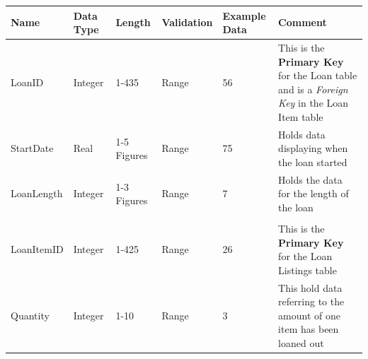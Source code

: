 \begin{landscape}
    \begin{center}
        \begin{tabular}{|p{3cm}|p{2cm}|p{3cm}|p{2cm}|p{2cm}|p{5cm}|}
            \hline
            \textbf{Name} & \textbf{Data Type} & \textbf{Length} & \textbf{Validation} & \textbf{Example Data} & \textbf{Comment} \\ \hline
            LoanID          & Integer & 1-435        & Range & 56  & This is the \textbf{Primary Key} for the Loan table and is a \emph{Foreign Key} in the Loan Item 
                                                                     table \\ \hline
            StartDate       & Real    & 1-5 Figures  & Range & 75  & Holds data displaying when the loan started \\ \hline
            LoanLength      & Integer & 1-3 Figures  & Range & 7   & Holds the data for the length of the loan \\ \hline
                            &         &              &       &     & \\ \hline
            LoanItemID      & Integer & 1-425        & Range & 26  & This is the \textbf{Primary Key} for the Loan Listings table \\ \hline
            Quantity        & Integer & 1-10         & Range & 3   & This hold data referring to the amount of one item has been loaned out \\ \hline
        \end{tabular}
    \end{center}
\end{landscape}



